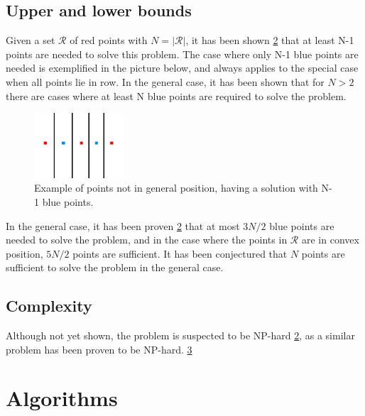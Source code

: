 \documentclass[a4paper,12pt]{article}
\begin{document}
\subsection{Upper and lower bounds}
Given a set $\mathcal{R}$ of red points with $N = |\mathcal{R}|$, it has been shown \hyperref[ref:blocking]{2} that at least N-1 points are needed to solve this problem. The case where only N-1 blue points are needed is exemplified in the picture below, and always applies to the special case when all points lie in row. In the general case, it has been shown that for $N>2$ there are cases where at least N blue points are required to solve the problem.

\begin{figure}[hb]
\centering
\includegraphics[width=0.3\textwidth]{pictures/N-1solution.png}
 \caption[Close up of \textit{Hemidactylus} sp.]
{Example of points not in general position, having a solution with N-1 blue points.}
\end{figure}

In the general case, it has been proven \hyperref[ref:blocking]{2} that at most $3N/2$ blue points are needed to solve the problem, and in the case where the points in  $\mathcal{R}$ are in convex position, $5N/2$ points are sufficient. It has been conjectured that $N$ points are sufficient to solve the problem in the general case.


\subsection{Complexity}
Although not yet shown, the problem is suspected to be NP-hard \hyperref[ref:blocking]{2}, as a similar problem has been proven to be NP-hard. \hyperref[ref:alexander]{3}

\section{Algorithms}
\end{document}
